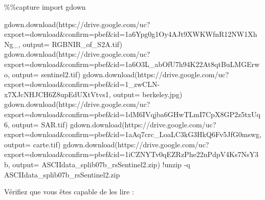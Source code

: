 \documentclass[
  french,
  11pt,
  letterpaper,
  open=any,
  twoside=false,
  french]{scrbook}
\newenvironment{Shaded}{\begin{snugshade}}{\end{snugshade}}
\newcommand{\BuiltInTok}[1]{\textcolor[rgb]{0.00,0.23,0.31}{#1}}
\newcommand{\ImportTok}[1]{\textcolor[rgb]{0.00,0.46,0.62}{#1}}
\newcommand{\NormalTok}[1]{\textcolor[rgb]{0.00,0.23,0.31}{#1}}
\newcommand{\OperatorTok}[1]{\textcolor[rgb]{0.37,0.37,0.37}{#1}}
\newcommand{\StringTok}[1]{\textcolor[rgb]{0.13,0.47,0.30}{#1}}
\begin{document}
\begin{Shaded}
\begin{Highlighting}[]
\OperatorTok{\%\%}\NormalTok{capture}
\ImportTok{import}\NormalTok{ gdown}

\NormalTok{gdown.download(}\StringTok{\textquotesingle{}https://drive.google.com/uc?export=download\&confirm=pbef\&id=1a6Ypg0g1Oy4AJt9XWKWfnR12NW1XhNg\_\textquotesingle{}}\NormalTok{, output}\OperatorTok{=} \StringTok{\textquotesingle{}RGBNIR\_of\_S2A.tif\textquotesingle{}}\NormalTok{)}
\NormalTok{gdown.download(}\StringTok{\textquotesingle{}https://drive.google.com/uc?export=download\&confirm=pbef\&id=1a6O3L\_abOfU7h94K22At8qtBuLMGErwo\textquotesingle{}}\NormalTok{, output}\OperatorTok{=} \StringTok{\textquotesingle{}sentinel2.tif\textquotesingle{}}\NormalTok{)}
\NormalTok{gdown.download(}\StringTok{\textquotesingle{}https://drive.google.com/uc?export=download\&confirm=pbef\&id=1\_zwCLN{-}x7XJcNHJCH6Z8upEdUXtVtvs1\textquotesingle{}}\NormalTok{, output}\OperatorTok{=} \StringTok{\textquotesingle{}berkeley.jpg\textquotesingle{}}\NormalTok{)}
\NormalTok{gdown.download(}\StringTok{\textquotesingle{}https://drive.google.com/uc?export=download\&confirm=pbef\&id=1dM6IVqjba6GHwTLmI7CpX8GP2z5txUq6\textquotesingle{}}\NormalTok{, output}\OperatorTok{=} \StringTok{\textquotesingle{}SAR.tif\textquotesingle{}}\NormalTok{)}
\NormalTok{gdown.download(}\StringTok{\textquotesingle{}https://drive.google.com/uc?export=download\&confirm=pbef\&id=1aAq7crc\_LoaLC3kG3HkQ6Fv5JfG0mswg\textquotesingle{}}\NormalTok{, output}\OperatorTok{=} \StringTok{\textquotesingle{}carte.tif\textquotesingle{}}\NormalTok{)}
\NormalTok{gdown.download(}\StringTok{\textquotesingle{}https://drive.google.com/uc?export=download\&confirm=pbef\&id=1iCZNYTv0qEZRzPhe22nPdpV4Ks7NsY3b\textquotesingle{}}\NormalTok{, output}\OperatorTok{=} \StringTok{\textquotesingle{}ASCIIdata\_splib07b\_rsSentinel2.zip\textquotesingle{}}\NormalTok{)}
\OperatorTok{!}\NormalTok{unzip }\OperatorTok{{-}}\NormalTok{q ASCIIdata\_splib07b\_rsSentinel2.}\BuiltInTok{zip}
\end{Highlighting}
\end{Shaded}

Vérifiez que vous êtes capable de les lire :
\end{document}
